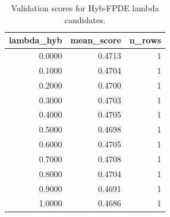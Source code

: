 \begin{table}[t]
\caption{Validation scores for Hyb-FPDE lambda candidates.}
\label{tab:lambda_distribution_computed}
\centering
\begin{tabular}{rrr}
\toprule
lambda\_hyb & mean\_score & n\_rows \\
\midrule
0.0000 & 0.4713 & 1 \\
0.1000 & 0.4704 & 1 \\
0.2000 & 0.4700 & 1 \\
0.3000 & 0.4703 & 1 \\
0.4000 & 0.4705 & 1 \\
0.5000 & 0.4698 & 1 \\
0.6000 & 0.4705 & 1 \\
0.7000 & 0.4708 & 1 \\
0.8000 & 0.4704 & 1 \\
0.9000 & 0.4691 & 1 \\
1.0000 & 0.4686 & 1 \\
\bottomrule
\end{tabular}

\end{table}
